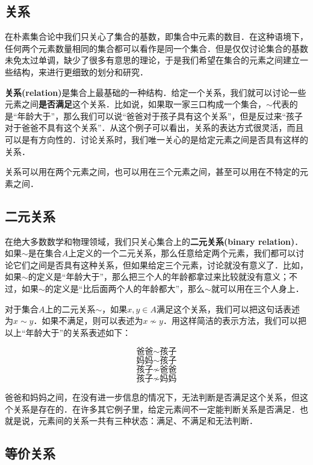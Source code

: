 \subsection{关系}

在朴素集合论中我们只关心了集合的基数，即集合中元素的数目．在这种语境下，任何两个元素数量相同的集合都可以看作是同一个集合．但是仅仅讨论集合的基数未免太过单调，缺少了很多有意思的理论，于是我们希望在集合的元素之间建立一些结构，来进行更细致的划分和研究．

\textbf{关系(relation)}是集合上最基础的一种结构．给定一个关系，我们就可以讨论一些元素之间\textbf{是否满足}这个关系．比如说，如果取一家三口构成一个集合，$\sim$代表的是“年龄大于”，那么我们可以说“爸爸对于孩子具有这个关系”，但是反过来“孩子对于爸爸不具有这个关系”．从这个例子可以看出，关系的表达方式很灵活，而且可以是有方向性的．讨论关系时，我们唯一关心的是给定元素之间是否具有这样的关系．

关系可以用在两个元素之间，也可以用在三个元素之间，甚至可以用在不特定的元素之间．

\subsection{二元关系}

在绝大多数数学和物理领域，我们只关心集合上的\textbf{二元关系(binary relation)}．如果$\sim$是在集合$A$上定义的一个二元关系，那么任意给定两个元素，我们都可以讨论它们之间是否具有这种关系，但如果给定三个元素，讨论就没有意义了．比如，如果$\sim$的定义是“年龄大于”，那么把三个人的年龄都拿过来比较就没有意义；不过，如果$\sim$的定义是“比后面两个人的年龄都大”，那么$\sim$就可以用在三个人身上．

对于集合$A$上的二元关系$\sim$，如果$x, y\in A$满足这个关系，我们可以把这句话表述为$x\sim y$．如果不满足，则可以表述为$x\not\sim y$．用这样简洁的表示方法，我们可以把以上“年龄大于”的关系表述如下：

$$\text{爸爸}\sim\text{孩子}$$ $$\text{妈妈}\sim\text{孩子}$$ $$\text{孩子}\not\sim\text{爸爸}$$ $$\text{孩子}\not\sim\text{妈妈}$$

爸爸和妈妈之间，在没有进一步信息的情况下，无法判断是否满足这个关系，但这个关系是存在的．在许多其它例子里，给定元素间不一定能判断关系是否满足．也就是说，元素间的关系一共有三种状态：满足、不满足和无法判断．



\subsection{等价关系}

